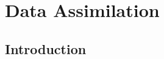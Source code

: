 \chapter{Data Assimilation}\label{ch:filtering}
\localtableofcontents

\section{Introduction}






